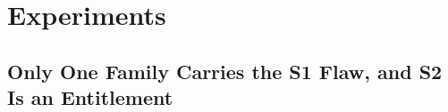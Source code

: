 \section{Experiments}
\label{sec:experiments}

\subsection{Only One Family Carries the S1 Flaw, and S2 Is an Entitlement}
\label{sec:held_out_form}
\label{sec:the_fix}
\label{sec:positive_control}
\label{sec:survey}
\label{sec:eqnet_audit}
\label{sec:causal_external}

